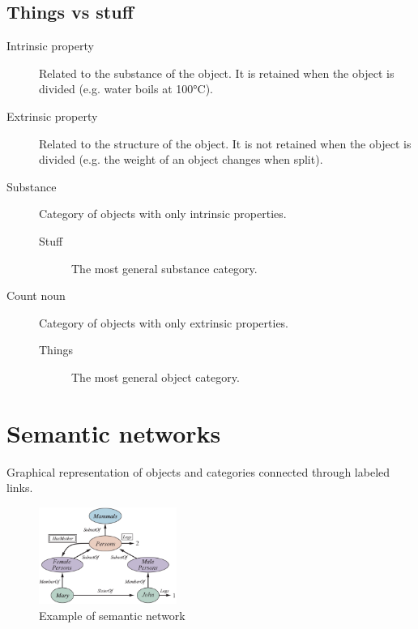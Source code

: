 \subsection{Things vs stuff}

\begin{description}
    \item[Intrinsic property] 
        Related to the substance of the object. It is retained when the object is divided
        (e.g. water boils at 100°C).

    \item[Extrinsic property] 
        Related to the structure of the object. It is not retained when the object is divided
        (e.g. the weight of an object changes when split).

    \item[Substance] 
        Category of objects with only intrinsic properties.

        \begin{description}
            \item[Stuff] 
                The most general substance category.
        \end{description}

    \item[Count noun] 
        Category of objects with only extrinsic properties.

        \begin{description}
            \item[Things] 
                The most general object category.
        \end{description}
\end{description}



\section{Semantic networks}
Graphical representation of objects and categories connected through labeled links.

\begin{figure}[h]
    \centering
    \includegraphics[width=0.4\textwidth]{img/semantic_network.png}
    \caption{Example of semantic network}
\end{figure}

